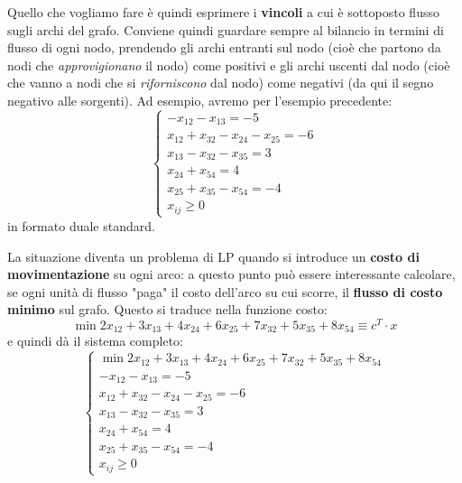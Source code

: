 \documentclass[a4paper,11pt]{article}
\begin{document}
Quello che vogliamo fare è quindi esprimere i \textbf{vincoli} a cui è sottoposto flusso sugli archi del grafo.
Conviene quindi guardare sempre al bilancio in termini di flusso di ogni nodo, prendendo gli archi entranti sul nodo (cioè che partono da nodi che \textit{approvigionano} il nodo) come positivi e gli archi uscenti dal nodo (cioè che vanno a nodi che si \textit{riforniscono} dal nodo) come negativi (da qui il segno negativo alle sorgenti).
Ad esempio, avremo per l'esempio precedente:
\[
	\begin{cases}
		-x_{12} - x_{13} = -5 \\ 
		x_{12} + x_{32} - x_{24} - x_{25} = -6 \\ 
		x_{13} - x_{32} - x_{35} = 3 \\ 
		x_{24} + x_{54} = 4 \\ 
		x_{25 }+ x_{35} - x_{54} = -4 \\ 
		x_{ij} \geq 0
	\end{cases}
\]
in formato duale standard.

La situazione diventa un problema di LP quando si introduce un \textbf{costo di movimentazione} su ogni arco: a questo punto può essere interessante calcolare, se ogni unità di flusso "paga" il costo dell'arco su cui scorre, il \textbf{flusso di costo minimo} sul grafo.
Questo si traduce nella funzione costo:
$$
\min{2 x_{12} + 3 x_{13} + 4 x_{24} + 6 x_{25} + 7 x_{32} + 5 x_{35} + 8 x_{54} \equiv c^T \cdot x}
$$
e quindi dà il sistema completo:
\[
	\begin{cases}
		\min{2 x_{12} + 3 x_{13} + 4 x_{24} + 6 x_{25} + 7 x_{32} + 5 x_{35} + 8 x_{54}} \\ 
		-x_{12} - x_{13} = -5 \\ 
		x_{12} + x_{32} - x_{24} - x_{25} = -6 \\ 
		x_{13} - x_{32} - x_{35} = 3 \\ 
		x_{24} + x_{54} = 4 \\ 
		x_{25 }+ x_{35} - x_{54} = -4 \\ 
		x_{ij} \geq 0
	\end{cases}
\]
\end{document}
